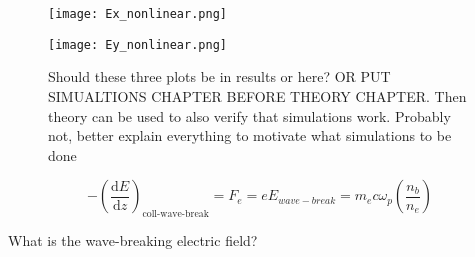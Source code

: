 \begin{figure}
\centering
\texttt{[image: Ex\_nonlinear.png]}
\end{figure}
\begin{figure}
\centering
\texttt{[image: Ey\_nonlinear.png]}
\caption{Should these three plots be in results or here? OR PUT SIMUALTIONS CHAPTER BEFORE THEORY CHAPTER. Then theory can be used to also verify that simulations work. Probably not, better explain everything to motivate what simulations to be done }
\end{figure}
\begin{equation}
-\left(\frac{\mathrm{d}E}{\mathrm{d}z}\right)_{\text{coll-wave-break}}=F_e=eE_{wave-break}=m_e c\omega_{p}\left(\frac{n_b}{n_e}\right)
\end{equation}

What is the wave-breaking electric field?

